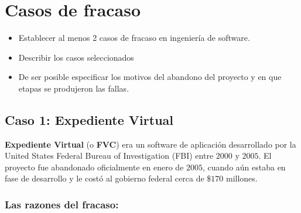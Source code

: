 \documentclass[titlepage,a4paper,twoside]{article}
\begin{document}
    \section{Casos de fracaso}
    
    \begin{itemize}
    	\item Establecer al menos 2 casos de fracaso en ingeniería de software.
    	\item Describir los casos seleccionados
    	\item De ser posible especificar los motivos del abandono del proyecto y en que etapas se produjeron
    	las fallas.
    \end{itemize}
    
    \subsection{Caso 1: Expediente Virtual}
    
    
    \textbf{Expediente Virtual} (o \textbf{FVC}) era un software de aplicación desarrollado por la United States Federal Bureau of Investigation (FBI) entre $2000$ y $2005$. El proyecto fue abandonado oficialmente en enero de $2005$, cuando aún estaba en fase de desarrollo y le costó al gobierno federal cerca de $\$170$ millones.
    
    
    \subsubsection{Las razones del fracaso:}
    
    
\end{document}

